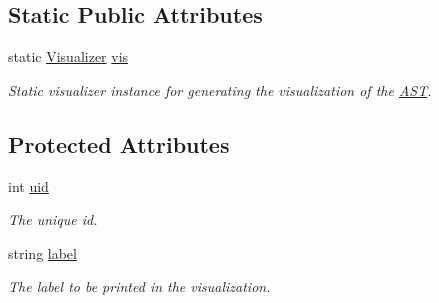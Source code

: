 \subsection*{Static Public Attributes}
\begin{DoxyCompactItemize}
\item 
\hypertarget{classAST_aca9e6637209b31e03a09c0d42f29bdfa}{static \hyperlink{classVisualizer}{Visualizer} \hyperlink{classAST_aca9e6637209b31e03a09c0d42f29bdfa}{vis}}\label{classAST_aca9e6637209b31e03a09c0d42f29bdfa}

\begin{DoxyCompactList}\small\item\em Static visualizer instance for generating the visualization of the \hyperlink{classAST}{A\-S\-T}. \end{DoxyCompactList}\end{DoxyCompactItemize}
\subsection*{Protected Attributes}
\begin{DoxyCompactItemize}
\item 
\hypertarget{classAST_a847b778f1c3dd5a19de32de432ee6e15}{int \hyperlink{classAST_a847b778f1c3dd5a19de32de432ee6e15}{uid}}\label{classAST_a847b778f1c3dd5a19de32de432ee6e15}

\begin{DoxyCompactList}\small\item\em The unique id. \end{DoxyCompactList}\item 
\hypertarget{classAST_ab2e239ccc0688d2341724432ff5a1a31}{string \hyperlink{classAST_ab2e239ccc0688d2341724432ff5a1a31}{label}}\label{classAST_ab2e239ccc0688d2341724432ff5a1a31}

\begin{DoxyCompactList}\small\item\em The label to be printed in the visualization. \end{DoxyCompactList}\end{DoxyCompactItemize}
